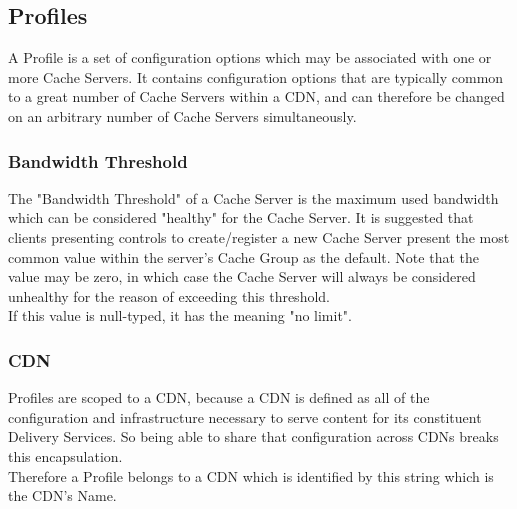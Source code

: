 %
%

\subsection{Profiles}
A Profile is a set of configuration options which may be associated with one or
more Cache Servers. It contains configuration options that are typically common
to a great number of Cache Servers within a CDN, and can therefore be changed
on an arbitrary number of Cache Servers simultaneously.

\subsubsection{Bandwidth Threshold}
The "Bandwidth Threshold" of a Cache Server is the maximum used bandwidth which
can be considered "healthy" for the Cache Server. It is suggested that clients
presenting controls to create/register a new Cache Server present the most
common value within the server's Cache Group as the default. Note that the value
may be zero, in which case the Cache Server will always be considered unhealthy
for the reason of exceeding this threshold.\\
If this value is null-typed, it has the meaning "no limit".

\subsubsection{CDN}
Profiles are scoped to a CDN, because a CDN is defined as all of the
configuration and infrastructure necessary to serve content for its constituent
Delivery Services. So being able to share that configuration across CDNs breaks
this encapsulation.\\
Therefore a Profile belongs to a CDN which is identified by this string which
is the CDN's Name.


